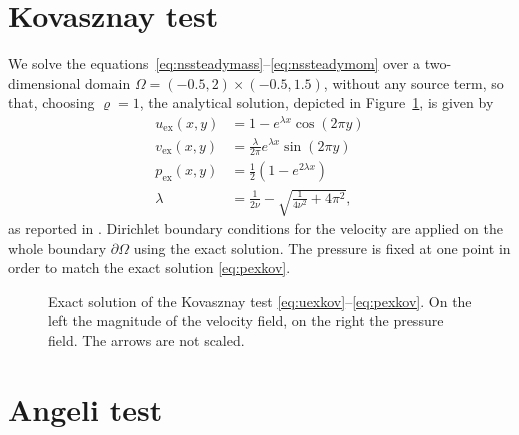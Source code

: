 \section{Kovasznay test}
We solve the equations~\eqref{eq:nssteadymass}--\eqref{eq:nssteadymom} over a 
two-dimensional domain $\Omega=(-0.5, 2) \times (-0.5,1.5)$, without any source 
term, so that, choosing $\varrho=1$, the analytical solution, depicted in 
Figure~\ref{fig:kovexact}, is given by
\begin{align}
\label{eq:uexkov} u_\text{ex}(x,y) &= 1-e^{\lambda x} \cos (2 \pi y)\\
v_\text{ex}(x,y) &= \frac{\lambda}{2\pi} e^{\lambda x} \sin (2\pi y)\\
\label{eq:pexkov}	p_\text{ex}(x,y) &= \frac{1}{2}(1 -e^{2\lambda x})\\
\lambda &= \frac{1}{2 \nu} - \sqrt{\frac{1}{4 \nu^2} + 4\pi^2},
\end{align}
as reported in \cite{test:kovasznay}.
Dirichlet boundary conditions for the velocity are applied on the whole 
boundary $\partial \Omega$ using the exact solution. The pressure is fixed at 
one point in order to match the exact solution \eqref{eq:pexkov}.
\begin{figure}
	\centering
	\caption[Exact solution of the Kovasznay test]{Exact solution of the 
	Kovasznay test \eqref{eq:uexkov}--\eqref{eq:pexkov}. On the left the 
	magnitude of the velocity field, on the 
	right the pressure field. The arrows are not scaled.}
	\label{fig:kovexact}
\end{figure}
%
\section{Angeli test}

